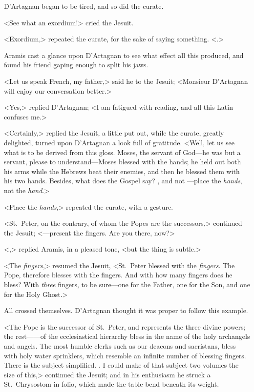 D'Artagnan began to be tired, and so did the curate. 

<See what an exordium!> cried the Jesuit. 

<Exordium,> repeated the curate, for the sake of saying something. <.> 

Aramis cast a glance upon D'Artagnan to see what effect all this produced, and found his friend gaping enough to split his jaws. 

<Let us speak French, my father,> said he to the Jesuit; <Monsieur D'Artagnan will enjoy our conversation better.> 

<Yes,> replied D'Artagnan; <I am fatigued with reading, and all this Latin confuses me.> 

<Certainly,> replied the Jesuit, a little put out, while the curate, greatly delighted, turned upon D'Artagnan a look full of gratitude. <Well, let us see what is to be derived from this gloss. Moses, the servant of God—he was but a servant, please to understand—Moses blessed with the hands; he held out both his arms while the Hebrews beat their enemies, and then he blessed them with his two hands. Besides, what does the Gospel say? , and not —place the \emph{hands}, not the \emph{hand}.> 

<Place the \emph{hands},> repeated the curate, with a gesture. 

<St.~Peter, on the contrary, of whom the Popes are the successors,> continued the Jesuit; <—present the fingers. Are you there, now?> 

<,> replied Aramis, in a pleased tone, <but the thing is subtle.> 

<The \emph{fingers},> resumed the Jesuit, <St.~Peter blessed with the \emph{fingers}. The Pope, therefore blesses with the fingers. And with how many fingers does he bless? With \emph{three} fingers, to be sure—one for the Father, one for the Son, and one for the Holy Ghost.> 

All crossed themselves. D'Artagnan thought it was proper to follow this example. 

<The Pope is the successor of St.~Peter, and represents the three divine powers; the rest——of the ecclesiastical hierarchy bless in the name of the holy archangels and angels. The most humble clerks such as our deacons and sacristans, bless with holy water sprinklers, which resemble an infinite number of blessing fingers. There is the subject simplified. . I could make of that subject two volumes the size of this,> continued the Jesuit; and in his enthusiasm he struck a St.~Chrysostom in folio, which made the table bend beneath its weight. 

